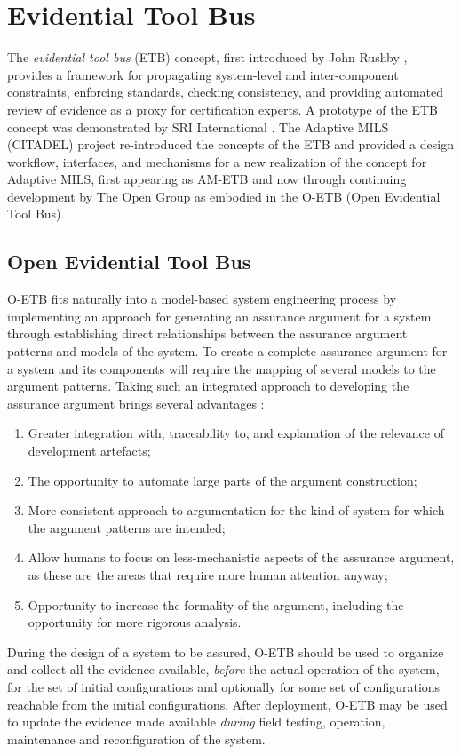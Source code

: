 \documentclass[12pt,twoside,a4paper]{article}
\begin{document}
\section{Evidential Tool Bus}
The \emph{evidential tool bus} (ETB) concept, first introduced by John Rushby
\cite{Rushby05ETB}, provides a framework for propagating system-level and
inter-component constraints, enforcing standards, checking consistency, and
providing automated review of evidence as a proxy for certification
experts.  A prototype of the ETB concept was demonstrated by SRI
International \cite{TI-ETB}.
The Adaptive MILS (CITADEL) project re-introduced the concepts
of the ETB and provided a design workflow, interfaces, and mechanisms for a
new realization of the concept for Adaptive MILS, first appearing as AM-ETB and now through continuing development by The Open Group as embodied in the O-ETB (Open Evidential Tool Bus).

\subsection{Open Evidential Tool Bus}
O-ETB fits naturally into a model-based system engineering process
by implementing an
approach for generating an assurance argument for a system through establishing direct relationships between the assurance argument patterns and models of the system.
To create a complete assurance argument for a system and its components will require the mapping of several models to the argument patterns.
Taking such an integrated approach to developing the assurance argument brings several advantages \cite{D-MILS-D2.4}:
\begin{enumerate}
\item Greater integration with, traceability to, and explanation of the relevance of development artefacts;
\item The opportunity to automate large parts of the argument construction;
\item More consistent approach to argumentation for the kind of system for which the argument patterns are intended;
\item Allow humans to focus on less-mechanistic aspects of the assurance argument, as these are the areas that require more human attention anyway;
\item Opportunity to increase the formality of the argument, including the opportunity for more rigorous analysis.
\end{enumerate}

During the design of a system to be assured, O-ETB should be used to organize and collect all the evidence
available, {\em before}
the actual operation of the system, for the set of initial configurations and optionally for some set
of configurations reachable from the initial configurations.
After deployment, O-ETB may be used to update
the evidence made available {\em during} field testing, operation, maintenance and reconfiguration of the system.
\end{document}
